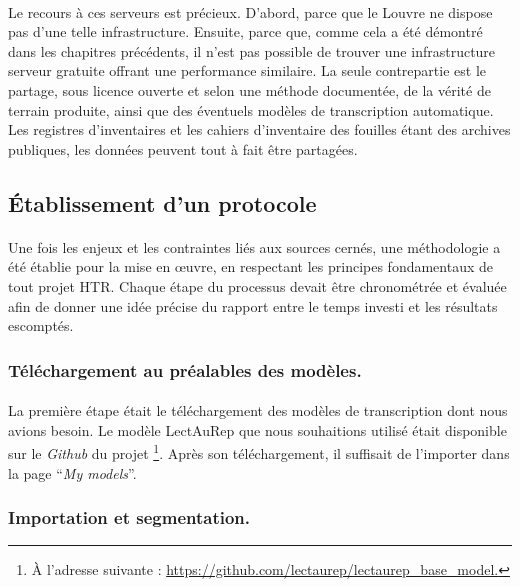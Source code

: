 \documentclass[a4paper,12pt,twoside]{book}
\begin{document}
\paragraph{}
Le recours à ces serveurs est précieux. D’abord, parce que le Louvre ne dispose pas d’une telle infrastructure. Ensuite, parce que, comme cela a été démontré dans les chapitres précédents, il n’est pas possible de trouver une infrastructure serveur gratuite offrant une performance similaire. La seule contrepartie est le partage, sous licence ouverte et selon une méthode documentée, de la vérité de terrain produite, ainsi que des éventuels modèles de transcription automatique. Les registres d’inventaires et les cahiers d’inventaire des fouilles étant des archives publiques, les données peuvent tout à fait être partagées. 
		
	\subsection{Établissement d'un protocole}

\paragraph{}
Une fois les enjeux et les contraintes liés aux sources cernés, une méthodologie a été établie pour la mise en œuvre, en respectant les principes fondamentaux de tout projet HTR. Chaque étape du processus devait être chronométrée et évaluée afin de donner une idée précise du rapport entre le temps investi et les résultats escomptés. 

\subsubsection{Téléchargement au préalables des modèles.}

\paragraph{}
La première étape était le téléchargement des modèles de transcription dont nous avions besoin. Le modèle LectAuRep que nous souhaitions utilisé était disponible sur le \textit{Github} du projet \footnote{À l'adresse suivante : \url{https://github.com/lectaurep/lectaurep_base_model.}}. Après son téléchargement, il suffisait de l'importer dans la page \enquote{\textit{My models}}. 


\subsubsection{Importation et segmentation.}
\end{document}
